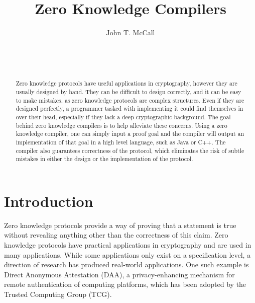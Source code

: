 \documentclass{sig-alternate}
\begin{document}

\title{Zero Knowledge Compilers}


\author{
\alignauthor
John T. McCall\\
	\\
	\\
	\\
}

\maketitle

\begin{abstract}
Zero knowledge protocols have useful applications in cryptography,
however they are usually designed by hand. They can be difficult to
design correctly, and it can be easy to make mistakes, as zero knowledge 
protocols are complex structures. Even if they are designed perfectly,
a programmer tasked with implementing it could find themselves in over
their head, especially if they lack a deep cryptographic background.
The goal behind zero knowledge compilers is to help alleviate these
concerns. Using a zero knowledge compiler, one can simply input a proof
goal and the compiler will output an implementation of that goal in a
high level language, such as Java or C++. The compiler also guarantees
correctness of the protocol, which eliminates the risk of subtle mistakes
in either the design or the implementation of the protocol.

\end{abstract}



\section{Introduction}
	Zero knowledge protocols provide a way of proving that a statement is true
	without revealing anything other than the correctness of this claim. Zero
	knowledge protocols have practical applications in cryptography and
	are used in many applications. While some applications only exist
	on a specification level, a direction of research has produced real-world
	applications. One such example is Direct Anonymous Attestation (DAA),
	a privacy-enhancing mechanism for remote authentication of computing
	platforms, which has been adopted by the Trusted Computing Group (TCG).
	
\end{document}
